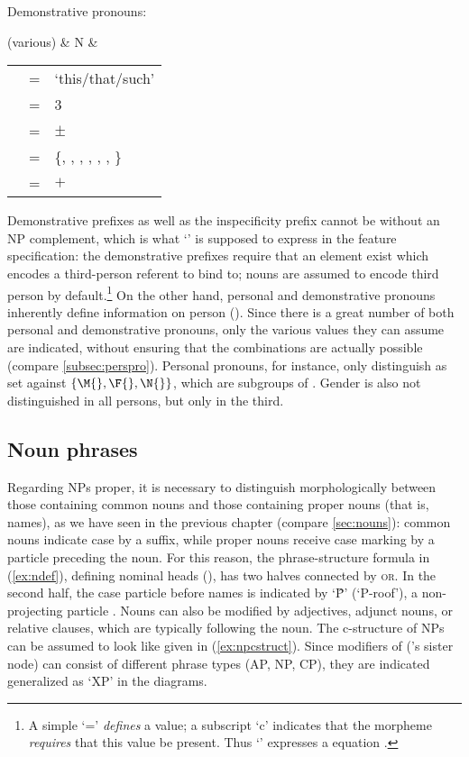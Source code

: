 \a Demonstrative pronouns:\medskip

	\begin{tabu} {}
	(various)
		& N
		& \begin{tabular}[t]{l l l}
			\ups{\Pred} & = & `this/that/such' \\
			\ups{\Pers} & = & 3 \\
			\ups{\Anim} & = & $\pm$ \\
			\ups{\Case} & = & \{\Aarg{}, \Parg{}, \Dat{}, \Gen{}, 
				\Loc{}, \Ins{}, \Caus{}\} \\
			\ups{\Spec} & = & $+$ \\
		\end{tabular}
	\end{tabu}
	
\xe

Demonstrative prefixes as well as the inspecificity prefix  
cannot be without an NP complement, which is what `\req{}' is supposed to 
express in the feature specification: the demonstrative prefixes require that 
an element exist which encodes a third-person referent to bind to; nouns 
are assumed to encode third person by default.\footnote{A simple `=' 
\emph{defines} a value; a subscript `c' indicates that the morpheme 
\emph{requires} that this value be present. Thus `\req{}' expresses a 
 equation \citep[59--61]{bresnan2016}.} On the other hand, 
personal and demonstrative pronouns inherently define information on person 
(\Pers{}). Since there is a great number of both personal and demonstrative 
pronouns, only the various values they can assume are indicated, without 
ensuring that the combinations are actually possible (compare 
\autoref{subsec:perspro}). Personal pronouns, for instance, only distinguish 
\Inan{} as set against $\{\M{}, \F{}, \N{}\}$, which are subgroups of \An{}. 
Gender is also not distinguished in all persons, but only in the third.

\subsection{Noun phrases}

Regarding NPs proper, it is necessary to distinguish morphologically between 
those containing common nouns and those containing proper nouns (that is,  
names), as we have seen in the previous chapter (compare \autoref{sec:nouns}): 
common nouns indicate case by a suffix, while proper nouns receive case marking 
by a particle preceding the noun. For this reason, the phrase-structure formula 
in (\ref{ex:ndef}), defining nominal heads (), has two halves 
connected by \textsc{or}. In the second half, the case particle before names is 
indicated by `\^P' (`P-roof'), a non-projecting particle 
\citep[116--117]{bresnan2016}. Nouns can also be modified by adjectives, 
adjunct nouns, or relative clauses, which are typically following the noun. The 
c-structure of NPs can be assumed to look like given in (\ref{ex:npcstruct}). 
Since modifiers of  ('s sister node) can consist of different 
phrase types (AP, NP, CP), they are indicated generalized as `XP' in the 
diagrams.

